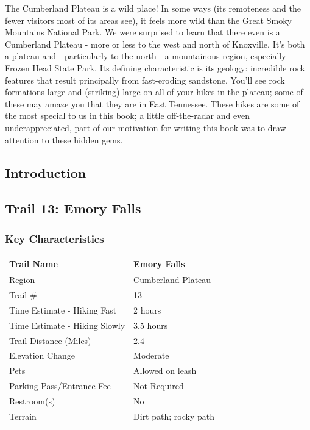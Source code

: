\documentclass[
  letterpaper,
  DIV=11,
  numbers=noendperiod]{scrartcl}
\begin{document}
The Cumberland Plateau is a wild place! In some ways (its remoteness and
the fewer visitors most of its areas see), it feels more wild than the
Great Smoky Mountains National Park. We were surprised to learn that
there even is a Cumberland Plateau - more or less to the west and north
of Knoxville. It's both a plateau and---particularly to the north---a
mountainous region, especially Frozen Head State Park. Its defining
characteristic is its geology: incredible rock features that result
principally from fast-eroding sandstone. You'll see rock formations
large and (striking) large on all of your hikes in the plateau; some of
these may amaze you that they are in East Tennessee. These hikes are
some of the most special to us in this book; a little off-the-radar and
even underappreciated, part of our motivation for writing this book was
to draw attention to these hidden gems.

\hypertarget{introduction-1}{%
\subsection{Introduction}\label{introduction-1}}

\hypertarget{trail-13-emory-falls}{%
\subsection{Trail 13: Emory Falls}\label{trail-13-emory-falls}}

\hypertarget{key-characteristics-12}{%
\subsubsection{Key Characteristics}\label{key-characteristics-12}}

\begin{longtable}[]{@{}ll@{}}
\toprule\noalign{}
Trail Name & Emory Falls \\
\midrule\noalign{}
\endhead
\bottomrule\noalign{}
\endlastfoot
Region & Cumberland Plateau \\
Trail \# & 13 \\
Time Estimate - Hiking Fast & 2 hours \\
Time Estimate - Hiking Slowly & 3.5 hours \\
Trail Distance (Miles) & 2.4 \\
Elevation Change & Moderate \\
Pets & Allowed on leash \\
Parking Pass/Entrance Fee & Not Required \\
Restroom(s) & No \\
Terrain & Dirt path; rocky path \\
\end{longtable}
\end{document}
